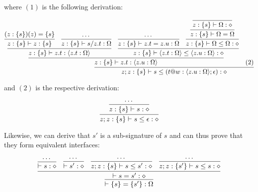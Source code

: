 \documentclass[twoside]{article}
\begin{document}
where $(1)$ is the following derivation:

\begin{displaymath}
\infer{z;z:\{s\} \vdash s \leq (t@w:\langle z.u:\Omega\rangle;\epsilon) : \diamond}{
  \infer{z:\{s\} \vdash z.t : \langle z.u:\Omega\rangle}{
    \infer{z:\{s\} \vdash z.t : \langle z.t:\Omega\rangle}{
      \infer{z:\{s\} \vdash z : \{s\}}{
        (z:\{s\})(z) = \{s\}
      }
      &
      \infer{z:\{s\} \vdash s/z.t : \Omega}{
        \cdots
      }
    }
    &
    \infer{z:\{s\} \vdash \langle z.t:\Omega\rangle \leq \langle z.u:\Omega\rangle : \diamond}{
      \infer{z:\{s\} \vdash z.t = z.u : \Omega}{
	\cdots
      }
      &
      \infer{z:\{s\} \vdash \Omega \leq \Omega : \diamond}{
        \infer{z:\{s\} \vdash \Omega = \Omega}{
	  \infer{z:\{s\} \vdash \Omega : \diamond}{}
	}
      }
    }
  }
  &
  (2)
}
\end{displaymath}

and $(2)$ is the respective derivation:

\begin{displaymath}
\infer{z;z:\{s\} \vdash s \leq \epsilon : \diamond}{
  \infer{z:\{s\} \vdash s : \diamond}{
    \cdots
  }
}
\end{displaymath}

Likewise, we can derive that $s'$ is a sub-signature of $s$ and can thus prove that they form equivalent interfaces:

\begin{displaymath}
\infer{\vdash \{s\} = \{s'\} : \Omega}{
  \infer{\vdash s = s' : \diamond}{
    \infer{\vdash s : \diamond}{\cdots}
    &
    \infer{\vdash s' : \diamond}{\cdots}
    &
    \infer{z;z:\{s\} \vdash s \leq s' : \diamond}{\cdots}
    &
    \infer{z;z:\{s'\} \vdash s \leq s : \diamond}{\cdots}
  }
}
\end{displaymath}

\end{document}
